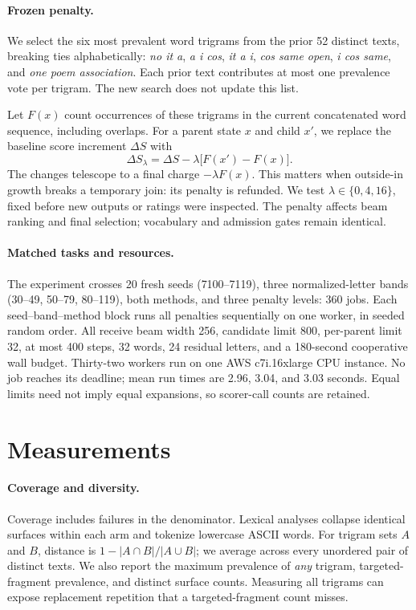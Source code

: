 \documentclass[11pt]{article}
\begin{document}
\paragraph{Frozen penalty.}
We select the six most prevalent word trigrams from the prior 52 distinct texts, breaking ties alphabetically: \emph{no it a}, \emph{a i cos}, \emph{it a i}, \emph{cos same open}, \emph{i cos same}, and \emph{one poem association}. Each prior text contributes at most one prevalence vote per trigram. The new search does not update this list.

Let $F(x)$ count occurrences of these trigrams in the current concatenated word sequence, including overlaps. For a parent state $x$ and child $x'$, we replace the baseline score increment $\Delta S$ with
\begin{equation}
\Delta S_\lambda=\Delta S-\lambda\bigl[F(x')-F(x)\bigr].
\end{equation}
The changes telescope to a final charge $-\lambda F(x)$. This matters when outside-in growth breaks a temporary join: its penalty is refunded. We test $\lambda\in\{0,4,16\}$, fixed before new outputs or ratings were inspected. The penalty affects beam ranking and final selection; vocabulary and admission gates remain identical.

\paragraph{Matched tasks and resources.}
The experiment crosses 20 fresh seeds (7100--7119), three normalized-letter bands (30--49, 50--79, 80--119), both methods, and three penalty levels: 360 jobs. Each seed--band--method block runs all penalties sequentially on one worker, in seeded random order. All receive beam width 256, candidate limit 800, per-parent limit 32, at most 400 steps, 32 words, 24 residual letters, and a 180-second cooperative wall budget. Thirty-two workers run on one AWS c7i.16xlarge CPU instance. No job reaches its deadline; mean run times are 2.96, 3.04, and 3.03 seconds. Equal limits need not imply equal expansions, so scorer-call counts are retained.

\section{Measurements}
\paragraph{Coverage and diversity.}
Coverage includes failures in the denominator. Lexical analyses collapse identical surfaces within each arm and tokenize lowercase ASCII words. For trigram sets $A$ and $B$, distance is $1-|A\cap B|/|A\cup B|$; we average across every unordered pair of distinct texts. We also report the maximum prevalence of \emph{any} trigram, targeted-fragment prevalence, and distinct surface counts. Measuring all trigrams can expose replacement repetition that a targeted-fragment count misses.
\end{document}

